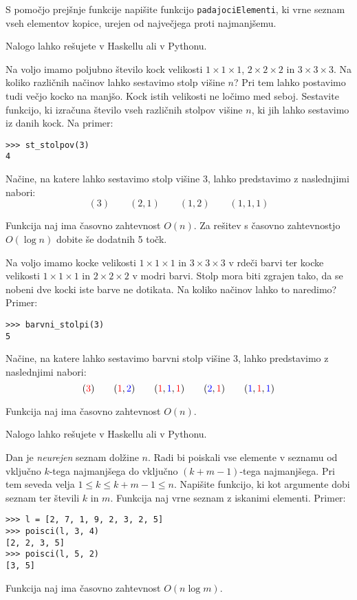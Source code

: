 \documentclass[arhiv]{../izpit}
\begin{document}
\podnaloga[10 točk]
  S pomočjo prejšnje funkcije napišite funkcijo \verb|padajociElementi|, ki
  vrne seznam vseh elementov kopice, urejen od največjega proti najmanjšemu.



Nalogo lahko rešujete v Haskellu ali v Pythonu.
 
 Na voljo imamo poljubno število kock velikosti $1 \times 1 \times 1$, $2 \times 2 \times 2$
  in $3 \times 3 \times 3$. Na koliko različnih načinov lahko sestavimo stolp višine $n$?
  Pri tem lahko postavimo tudi večjo kocko na manjšo. Kock istih velikosti ne ločimo med seboj. 
  Sestavite funkcijo, ki izračuna število vseh različnih stolpov višine $n$, ki jih
  lahko sestavimo iz danih kock. Na primer:
\begin{verbatim}>>> st_stolpov(3)
4
\end{verbatim}
%
Načine, na katere lahko sestavimo stolp višine 3, lahko predstavimo z naslednjimi nabori:
$$
(3) \qquad (2, 1) \qquad (1, 2) \qquad (1, 1, 1)
$$

\noindent
Funkcija naj ima časovno zahtevnost $O(n)$. Za rešitev s časovno zahtevnostjo $O(\log n)$ dobite
še dodatnih 5 točk.

\podnaloga[10 točk]
Na voljo imamo kocke velikosti $1 \times 1 \times 1$ in $3 \times 3 \times 3$ v rdeči barvi
ter kocke velikosti $1 \times 1 \times 1$ in $2 \times 2 \times 2$ v modri barvi. Stolp mora
biti zgrajen tako, da se nobeni dve kocki iste barve ne dotikata. Na koliko načinov lahko to
naredimo? Primer:
\begin{verbatim}>>> barvni_stolpi(3)
5
\end{verbatim}
%
Načine, na katere lahko sestavimo barvni stolp višine 3, lahko predstavimo z naslednjimi nabori:
$$
({\color{red}3}) \qquad ({\color{red}1}, {\color{blue}2})
\qquad ({\color{red}1}, {\color{blue}1}, {\color{red}1})
\qquad ({\color{blue}2}, {\color{red}1}) \qquad ({\color{blue}1}, {\color{red}1}, {\color{blue}1})
$$

\noindent
Funkcija naj ima časovno zahtevnost $O(n)$. 



Nalogo lahko rešujete v Haskellu ali v Pythonu.

\vspace{0.5\baselineskip}\noindent
Dan je \emph{neurejen} seznam dolžine $n$. Radi bi poiskali vse elemente v seznamu od vključno
$k$-tega najmanjšega do vključno $(k+m-1)$-tega najmanjšega. Pri tem seveda velja
$1 \leq k \leq k + m - 1 \leq n$. Napišite funkcijo, ki kot argumente dobi seznam ter števili $k$ in $m$.
Funkcija naj vrne seznam z iskanimi elementi. Primer:

\begin{verbatim}>>> l = [2, 7, 1, 9, 2, 3, 2, 5]
>>> poisci(l, 3, 4)
[2, 2, 3, 5]
>>> poisci(l, 5, 2)
[3, 5]
\end{verbatim}

\noindent
Funkcija naj ima časovno zahtevnost $O(n \log m)$. 
 
\end{document}
